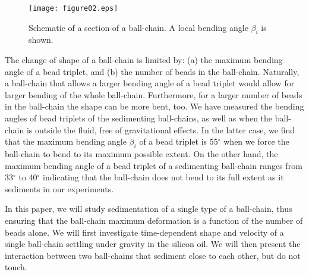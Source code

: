 \documentclass{article}
\begin{document}
\begin{figure}[h!]
 \centering
 \texttt{[image: figure02.eps]}
 \caption{Schematic of a section of a ball-chain. A local bending angle $\beta_i$ is shown.} %
 \label{fig:angle_beta}
\end{figure}

The change of shape %
of a ball-chain is limited %
by: (a) the maximum bending angle of a bead triplet, %
and (b) the number of beads in the ball-chain.  Naturally, a ball-chain that allows a larger %
bending angle of a bead triplet %
would allow for %
larger bending of the whole %
ball-chain. Furthermore,
for a larger %
number of beads in the ball-chain  %
the shape can be more bent, %
too. %
We have measured the bending angles of bead triplets of the sedimenting ball-chains, as well as when the ball-chain is outside the fluid, free of gravitational effects. In the latter case, we find that the maximum bending angle $\beta_i$ of a bead triplet %
is 55$^{\circ}$ when we force the ball-chain to bend to its maximum possible extent. On the other hand, the maximum bending angle of a bead triplet of a sedimenting ball-chain ranges from 33$^{\circ}$ to 40$^{\circ}$ indicating that the ball-chain does not bend to its full extent as it sediments in our experiments.    

In this paper, we will study %
sedimentation of a single type of a ball-chain, thus ensuring that the ball-chain maximum deformation %
is a function of the number of beads alone. We will first investigate %
time-dependent shape and velocity of a single ball-chain settling under gravity in the silicon oil.  %
We will then present the interaction between two ball-chains that sediment close to each other, but do not touch. %
\end{document}
